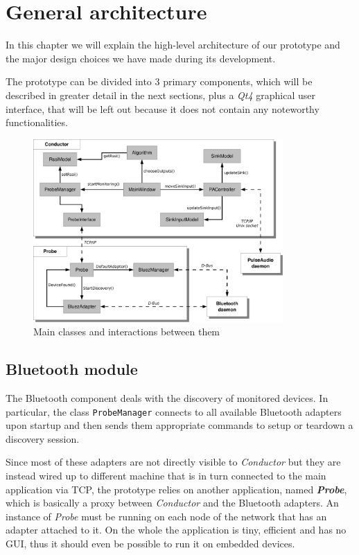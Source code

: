 \documentclass[conference]{IEEEtran}
\newcommand{\Conductor}{\textsl{Conductor}}
\newcommand{\Probe}{\textsl{Probe}}
\begin{document}
\section{General architecture}
In this chapter we will explain the high-level architecture of our prototype and the major design choices we have made during its development.

The prototype can be divided into 3 primary components, which will be described in greater detail in the next sections, plus a \textsl{Qt4} graphical user interface, that will be left out because it does not contain any noteworthy functionalities.

\begin{figure}
\centering
\includegraphics[width=0.85\textwidth]{Arch}
\caption{Main classes and interactions between them}
\label{arch}
\end{figure}

\subsection{Bluetooth module}
The Bluetooth component deals with the discovery of monitored devices. In particular, the class \texttt{ProbeManager} connects to all available Bluetooth adapters upon startup and then sends them appropriate commands to setup or teardown a discovery session.

Since most of these adapters are not directly visible to \Conductor{} but they are instead wired up to different machine that is in turn connected to the main application via TCP, the prototype relies on another application, named \textbf{\Probe{}}, which is basically a proxy between \Conductor{} and the Bluetooth adapters. An instance of \Probe{} must be running on each node of the network that has an adapter attached to it. On the whole the application is tiny, efficient and has no GUI, thus it should even be possible to run it on embedded devices.
\end{document}
